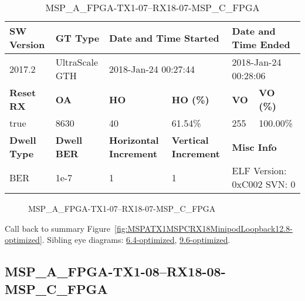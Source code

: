 \begin{table}[h]
\centering
\caption{MSP\_A\_FPGA-TX1-07--RX18-07-MSP\_C\_FPGA}
\label{tab:MSPAFPGATX107RX1807MSPCFPGA12.8-optimized}
\begin{tabular}{@{}|l|l|l|l|l|l|@{}}
\toprule
\textbf{SW Version}                & \textbf{GT Type}   & \multicolumn{2}{l|}{\textbf{Date and Time Started}}            & \multicolumn{2}{l|}{\textbf{Date and Time Ended}}        \\ \midrule
2017.2                       & UltraScale GTH          & \multicolumn{2}{l|}{2018-Jan-24 00:27:44}                   & \multicolumn{2}{l|}{2018-Jan-24 00:28:06}               \\ \midrule
\textbf{Reset RX}                  & \textbf{OA} & \textbf{HO}   & \textbf{HO (\%)} & \textbf{VO} & \textbf{VO (\%)} \\ \midrule
true & 8630        & 40          & 61.54\%        & 255        & 100.00\%       \\ \midrule
\textbf{Dwell Type}                & \textbf{Dwell BER} & \textbf{Horizontal Increment} & \textbf{Vertical Increment}    & \multicolumn{2}{l|}{\textbf{Misc Info}}                  \\ \midrule
BER                            & 1e-7        & 1        & 1           & \multicolumn{2}{l|}{ELF Version: 0xC002 SVN: 0}                         \\ \bottomrule
\end{tabular}
\end{table}

\begin{figure}[h]
\caption{MSP\_A\_FPGA-TX1-07--RX18-07-MSP\_C\_FPGA} \label{fig:MSPAFPGATX107RX1807MSPCFPGA12.8-optimized}
\end{figure}

Call back to summary Figure~\ref{fig:MSPATX1MSPCRX18MinipodLoopback12.8-optimized}.
Sibling eye diagrams: \hyperref[sec:MSPAFPGATX107RX1807MSPCFPGA6.4-optimized]{6.4-optimized}, \hyperref[sec:MSPAFPGATX107RX1807MSPCFPGA9.6-optimized]{9.6-optimized}.

\clearpage
\newpage


\subsection{MSP\_A\_FPGA-TX1-08--RX18-08-MSP\_C\_FPGA}\label{sec:MSPAFPGATX108RX1808MSPCFPGA12.8-optimized}

